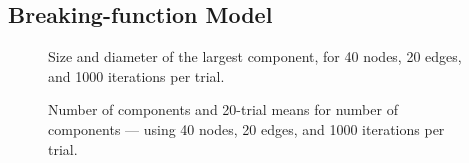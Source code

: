 \documentclass[a4paper,10pt]{article}
\begin{document}
\subsection{Breaking-function Model}

\begin{figure}[H]
\begin{center}
\caption{Size and diameter of the largest component, for 40 nodes, 20 edges, and 1000 iterations per trial.}
\end{center}
\end{figure} 

\begin{figure}[H]
\begin{center}
\caption{Number of components and 20-trial means for number of components --- using 40 nodes, 20 edges, and 1000 iterations per trial.}
\end{center}
\end{figure} 
\end{document}
